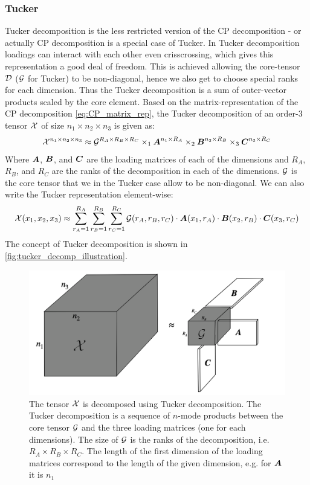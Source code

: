 \subsubsection{Tucker}
Tucker decomposition is the less restricted version of the CP decomposition - or actually CP decomposition is a special case of Tucker. In Tucker decomposition loadings can interact with each other even crisscrossing, which gives this representation a good deal of freedom. This is achieved allowing the core-tensor $\mathcal{D}$ ($\mathcal{G}$ for Tucker) to be non-diagonal, hence we also get to choose special ranks for each dimension. Thus the Tucker decomposition is a sum of outer-vector products scaled by the core element. Based on the matrix-representation of the CP decomposition \eqref{eq:CP_matrix_rep}, the Tucker decomposition of an order-3 tensor $\mathcal{X}$ of size $n_1 \times n_2 \times n_3$ is given as:
\begin{equation}
    \mathcal{X}^{n_1 \times n_2 \times n_3} \approx \mathcal{G}^{R_A \times R_B \times R_C} \times_1 \boldsymbol{A}^{n_1 \times R_A} \times_2 \boldsymbol{B}^{n_2 \times R_B} \times_3 \boldsymbol{C}^{n_3 \times R_C}
\end{equation}
Where $\boldsymbol{A}$, $\boldsymbol{B}$, and $\boldsymbol{C}$ are the loading matrices of each of the dimensions and $R_A$, $R_B$, and $R_C$ are the ranks of the decomposition in each of the dimensions. $\mathcal{G}$ is the core tensor that we in the Tucker case allow to be non-diagonal. We can also write the Tucker representation element-wise:
\begin{equation}
    \mathcal{X}(x_1,x_2,x_3) \approx \sum_{r_A=1}^{R_A} \sum_{r_B=1}^{R_B} \sum_{r_C=1}^{R_C} \mathcal{G}(r_A, r_B, r_C) \cdot \boldsymbol{A}(x_1, r_A) \cdot \boldsymbol{B}(x_2, r_B) \cdot \boldsymbol{C}(x_3, r_C)
\end{equation}
The concept of Tucker decomposition is shown in \autoref{fig:tucker_decomp_illustration}. 
\begin{figure}
    \centering
    \captionsetup{width=.95\linewidth}
    \includegraphics[width=.7\linewidth]{Pics/02_Theory/Tucker_decomp_illustration.png}
    \caption{The tensor $\mathcal{X}$ is decomposed using Tucker decomposition. The Tucker decomposition is a sequence of $n$-mode products between the core tensor $\mathcal{G}$ and the three loading matrices (one for each dimensions). The size of $\mathcal{G}$ is the ranks of the decomposition, i.e. $R_A \times R_B \times R_C$. The length of the first dimension of the loading matrices correspond to the length of the given dimension, e.g. for $\boldsymbol{A}$ it is $n_1$}
    \label{fig:tucker_decomp_illustration}
\end{figure}
